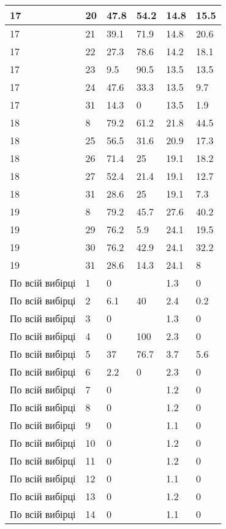 \begin{longtable}[c]{ | p{2cm} | p{2cm} | p{2cm} | p{2cm} | p{3cm} | p{3cm} | }
	\hline
	17 & 20 & 47.8 & 54.2 & 14.8 & 15.5 \\
	\hline
	17 & 21 & 39.1 & 71.9 & 14.8 & 20.6 \\
	\hline
	17 & 22 & 27.3 & 78.6 & 14.2 & 18.1 \\
	\hline
	17 & 23 & 9.5 & 90.5 & 13.5 & 13.5 \\
	\hline
	17 & 24 & 47.6 & 33.3 & 13.5 & 9.7 \\
	\hline
	17 & 31 & 14.3 & 0 & 13.5 & 1.9 \\
	\hline
	\hline
	\hline
	18 & 8 & 79.2 & 61.2 & 21.8 & 44.5 \\
	\hline
	18 & 25 & 56.5 & 31.6 & 20.9 & 17.3 \\
	\hline
	18 & 26 & 71.4 & 25 & 19.1 & 18.2 \\
	\hline
	18 & 27 & 52.4 & 21.4 & 19.1 & 12.7 \\
	\hline
	18 & 31 & 28.6 & 25 & 19.1 & 7.3 \\
	\hline
	\hline
	\hline
	19 & 8 & 79.2 & 45.7 & 27.6 & 40.2 \\
	\hline
	19 & 29 & 76.2 & 5.9 & 24.1 & 19.5 \\
	\hline
	19 & 30 & 76.2 & 42.9 & 24.1 & 32.2 \\
	\hline
	19 & 31 & 28.6 & 14.3 & 24.1 & 8 \\
	\hline
	\hline
	\hline
	По всій вибірці & 1 & 0 &  & 1.3 & 0 \\
	\hline
	По всій вибірці & 2 & 6.1 & 40 & 2.4 & 0.2 \\
	\hline
	По всій вибірці & 3 & 0 &  & 1.3 & 0 \\
	\hline
	По всій вибірці & 4 & 0 & 100 & 2.3 & 0 \\
	\hline
	По всій вибірці & 5 & 37 & 76.7 & 3.7 & 5.6 \\
	\hline
	По всій вибірці & 6 & 2.2 & 0 & 2.3 & 0 \\
	\hline
	По всій вибірці & 7 & 0 &  & 1.2 & 0 \\
	\hline
	По всій вибірці & 8 & 0 &  & 1.2 & 0 \\
	\hline
	По всій вибірці & 9 & 0 &  & 1.1 & 0 \\
	\hline
	По всій вибірці & 10 & 0 &  & 1.2 & 0 \\
	\hline
	По всій вибірці & 11 & 0 &  & 1.2 & 0 \\
	\hline
	По всій вибірці & 12 & 0 &  & 1.1 & 0 \\
	\hline
	По всій вибірці & 13 & 0 &  & 1.2 & 0 \\
	\hline
	По всій вибірці & 14 & 0 &  & 1.1 & 0 \\

\end{longtable}
